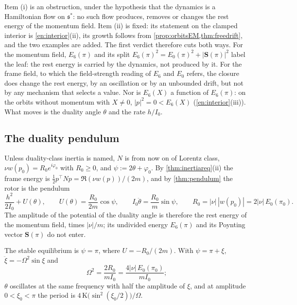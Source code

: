 Item (i) is an obstruction, under the hypothesis that the dynamics is a Hamiltonian flow on $\mathfrak s^*$: no such flow produces, removes or
changes the rest energy of the momentum field. Item (ii) is fixed: its statement on the clamped interior is \cref{en:interior}(ii), its growth follows from \cref{prop:orbitsEM,thm:freedrift}, and the two examples are added. The first verdict therefore cuts both
ways. For the momentum field, $E_6(\pi)$ and its split $E_6(\pi)^2=E_0(\pi)^2+|\mathbf S(\pi)|^2$ label the leaf: the rest energy is carried by the
dynamics, not produced by it. For the frame field, to which the field-strength reading of $E_6$ and $E_0$ refers, the closure does change the rest
energy, by an oscillation or by an unbounded drift, but not by any mechanism that selects a value. Nor is $E_6(X)$ a function of
$E_6(\pi)$: on the orbits without momentum with $X\neq0$, $|p|^2=0<E_6(X)$ (\cref{en:interior}(iii)). What moves is the duality angle $\theta$
and the rate $h/I_0$.

\subsection{The duality pendulum}
\label{sec:restpendulum}

Unless duality-class inertia is named, $N$ is from now on of Lorentz class, $\nu w(p_0)=R_0e^{i\varphi_0}$ with $R_0\ge0$, and $\psi:=2\theta+\varphi_0$. By \cref{thm:inertiareq}(ii) the
frame energy is $\tfrac12p^{\!\top}Np=\Re(\nu w(p))/(2m)$, and by \cref{thm:pendulum} the rotor is the pendulum
\[
\frac{h^2}{2I_0}+U(\theta),\qquad U(\theta)=\frac{R_0}{2m}\cos\psi,\qquad I_0\ddot\theta=\frac{R_0}m\sin\psi,\qquad
R_0=|\nu|\,|w(p_0)|=2|\nu|\,E_0(\pi_0).
\]
The amplitude of the potential of the duality angle is therefore the rest energy of the momentum field, times $|\nu|/m$; its undivided energy
$E_6(\pi)$ and its Poynting vector $\mathbf S(\pi)$ do not enter.

\begin{proposition}
\label{cl:omega}
The stable equilibrium is $\psi=\pi$, where $U=-R_0/(2m)$. With $\psi=\pi+\xi$, $\ddot\xi=-\Omega^2\sin\xi$ and
\[
\Omega^2=\frac{2R_0}{mI_0}=\frac{4|\nu|\,E_0(\pi_0)}{mI_0} ;
\]
$\theta$ oscillates at the same frequency with half the amplitude of $\xi$, and at amplitude $0<\xi_0<\pi$ the period is
$4\,\mathrm K\bigl(\sin^2(\xi_0/2)\bigr)/\Omega$.
\end{proposition}

